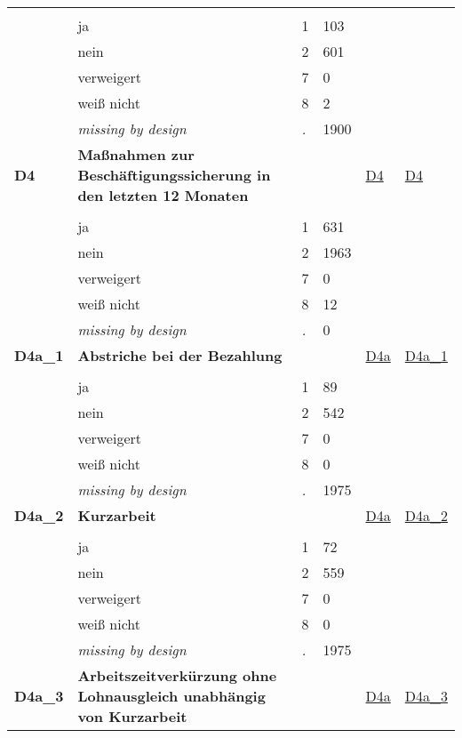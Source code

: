 \begin{longtable}{| L{2.45cm} | L{6cm} | C{1.5cm} | R{1cm} | C{2.25cm} | C{2.25cm} |}
   &  &  &  &  &  \\ 
   & ja & 1 & 103 &  &  \\ 
   & nein & 2 & 601 &  &  \\ 
   & verweigert & 7 & 0 &  &  \\ 
   & weiß nicht & 8 & 2 &  &  \\ 
   & \textit{missing by design} & \textit{.} & 1900 &  &  \\ 
   \midrule
\textbf{D4}\label{var:D4} & \textbf{Maßnahmen zur Beschäftigungssicherung in den letzten 12 Monaten} &  &  & \hyperref[D4]{D4} & \hyperref[var:suf:D4]{D4} \\ 
   &  &  &  &  &  \\ 
   & ja & 1 & 631 &  &  \\ 
   & nein & 2 & 1963 &  &  \\ 
   & verweigert & 7 & 0 &  &  \\ 
   & weiß nicht & 8 & 12 &  &  \\ 
   & \textit{missing by design} & \textit{.} & 0 &  &  \\ 
   \midrule
\textbf{D4a\_1}\label{var:D4a:1} & \textbf{Abstriche bei der Bezahlung} &  &  & \hyperref[D4a]{D4a} & \hyperref[var:suf:D4a:1]{D4a\_1} \\ 
   &  &  &  &  &  \\ 
   & ja & 1 & 89 &  &  \\ 
   & nein & 2 & 542 &  &  \\ 
   & verweigert & 7 & 0 &  &  \\ 
   & weiß nicht & 8 & 0 &  &  \\ 
   & \textit{missing by design} & \textit{.} & 1975 &  &  \\ 
   \midrule
\textbf{D4a\_2}\label{var:D4a:2} & \textbf{Kurzarbeit} &  &  & \hyperref[D4a]{D4a} & \hyperref[var:suf:D4a:2]{D4a\_2} \\ 
   &  &  &  &  &  \\ 
   & ja & 1 & 72 &  &  \\ 
   & nein & 2 & 559 &  &  \\ 
   & verweigert & 7 & 0 &  &  \\ 
   & weiß nicht & 8 & 0 &  &  \\ 
   & \textit{missing by design} & \textit{.} & 1975 &  &  \\ 
   \midrule
\textbf{D4a\_3}\label{var:D4a:3} & \textbf{Arbeitszeitverkürzung ohne Lohnausgleich unabhängig von Kurzarbeit} &  &  & \hyperref[D4a]{D4a} & \hyperref[var:suf:D4a:3]{D4a\_3} \\ 

\end{longtable}
